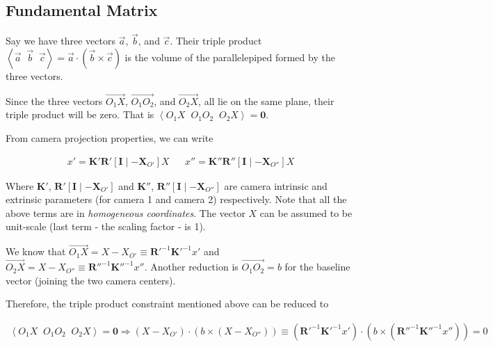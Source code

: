 
\subsection{Fundamental Matrix}

Say we have three vectors $\vec{a}$, $\vec{b}$, and $\vec{c}$. Their triple product $\left \langle \vec{a} \;\; \vec{b} \;\; \vec{c} \right \rangle = \vec{a} \cdot \left ( \vec{b} \times \vec{c} \right )$ is the volume of the parallelepiped formed by the three vectors.

Since the three vectors $\overrightarrow{O_1 X}$, $\overrightarrow{O_1 O_2}$, and $\overrightarrow{O_2 X}$, all lie on the same plane, their triple product will be zero. That is  $\left \langle O_1 X \;\; O_1 O_2 \;\; O_2 X \right \rangle = \mathbf{0}$.

From camera projection properties, we can write

\begin{align}
    x' = \mathbf{K}' \mathbf{R}' \left [ \mathbf{I} \mid -\mathbf{X}_{O'} \right ] X
    &&
    x'' = \mathbf{K}'' \mathbf{R}'' \left [ \mathbf{I} \mid -\mathbf{X}_{O''} \right ] X
    \label{eq:q2-camera-projection}
\end{align}

Where $\mathbf{K}'$, $\mathbf{R}' \left [ \mathbf{I} \mid -\mathbf{X}_{O'} \right ]$ and $\mathbf{K}''$, $\mathbf{R}'' \left [ \mathbf{I} \mid -\mathbf{X}_{O''} \right ]$ are camera intrinsic and extrinsic parameters (for camera 1 and camera 2) respectively. Note that all the above terms are in \textit{homogeneous coordinates}. The vector $X$ can be assumed to be unit-scale (last term - the scaling factor - is 1).

We know that $\overrightarrow{O_1 X} = X - X_{O'} \equiv \mathbf{R}'^{-1} \mathbf{K}'^{-1} x'$ and $\overrightarrow{O_2 X} = X - X_{O''} \equiv \mathbf{R}''^{-1} \mathbf{K}''^{-1} x''$. Another reduction is $\overrightarrow{O_1 O_2} = b$ for the baseline vector (joining the two camera centers).

Therefore, the triple product constraint mentioned above can be reduced to

\begin{align}
    \left \langle O_1 X \;\; O_1 O_2 \;\; O_2 X \right \rangle = \mathbf{0}
    \Rightarrow \left ( X - X_{O'} \right ) \cdot \left ( b \times \left ( X - X_{O''} \right ) \right ) 
    \equiv \left ( \mathbf{R}'^{-1} \mathbf{K}'^{-1} x' \right ) \cdot \left ( b \times \left ( \mathbf{R}''^{-1} \mathbf{K}''^{-1} x'' \right ) \right ) = 0
    \nonumber
\end{align}

